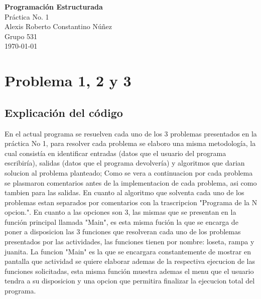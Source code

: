 \documentclass[12pt]{article}
\begin{document}
\begin{titlepage}
    \centering
    \vspace*{4cm}
    
    {\Large \textbf{Programación Estructurada}}\\[1cm]
    {\large Práctica No. 1}\\[2cm]
    
    {\large Alexis Roberto Constantino Núñez}\\
    {\large Grupo 531}\\[1cm]
    
    {\large \today}
\end{titlepage}

\section{Problema 1, 2 y 3}

\subsection{Explicación del código}
En el actual programa se resuelven cada uno de los 3 problemas presentados en la práctica No 1, para resolver cada problema se elaboro una misma metodología, la cual consistía en identificar entradas (datos que el usuario del programa escribiría), salidas (datos que el programa devolvería) y algoritmos que darian solucion al problema planteado; Como se vera a continuacion por cada problema se plasmaron comentarios antes de la implementacion de cada problema, asi como tambien para las salidas. En cuanto al algoritmo que solventa cada uno de los problemas estan separados por comentarios con la trascripcion "Programa de la N opcion.". En cuanto a las opciones son 3, las mismas que se presentan en la función principal llamada "Main", es esta misma fución la que se encarga de poner a disposicion las 3 funciones que resolveran cada uno de los problemas presentados por las actividades, las funciones tienen por nombre: loseta, rampa y juanita. La funcion "Main" es la que se encargara constantemente de mostrar en pantalla que actividad se quiere elaborar ademas de la respectiva ejecucion de las funciones solicitadas, esta misma función muestra ademas el menu que el usuario tendra a su disposicion y una opcion que permitira finalizar la ejecucion total del programa. 
\end{document}
